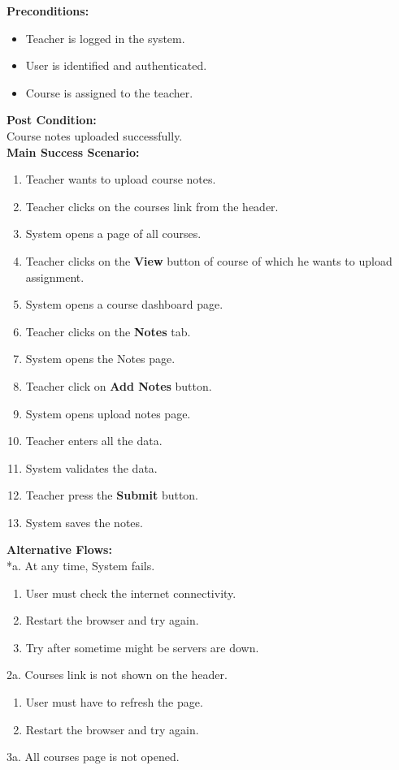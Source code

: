 \textbf{Preconditions:}
\begin{itemize}
\item Teacher is logged in the system.
\item User is identified and authenticated.
\item Course is assigned to the teacher.
\end{itemize}
\textbf{Post Condition: }\\
Course notes uploaded successfully.\\
\textbf{Main Success Scenario:}
\begin{enumerate}
\item Teacher wants to upload course notes.
\item Teacher clicks on the courses link from the header.
\item System opens a page of all courses.
\item Teacher clicks on the \textbf{View} button of course of which he wants to upload assignment.
\item System opens a course dashboard page.
\item Teacher clicks on the \textbf{Notes} tab.
\item System opens the Notes page.
\item Teacher click on \textbf{Add Notes} button.
\item System opens upload notes page.
\item Teacher enters all the data.
\item System validates the data.
\item Teacher press the \textbf{Submit} button.
\item System saves the notes.
\end{enumerate}
\textbf{Alternative Flows:}\\
*a. At any time, System fails.
\begin{enumerate}
\item User must check the internet connectivity.
\item Restart the browser and try again.
\item Try after sometime might be servers are down.
\end{enumerate}
2a. Courses link is not shown on the header.
\begin{enumerate}
\item User must have to refresh the page.
\item Restart the browser and try again.
\end{enumerate} 
3a. All courses page is not opened.
